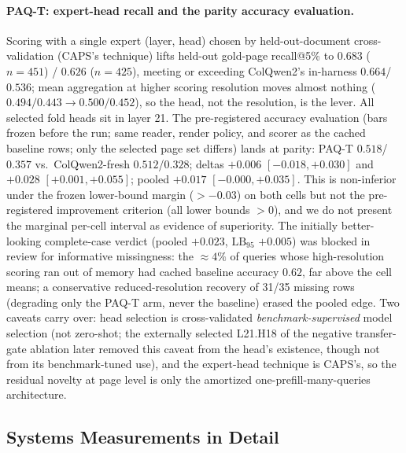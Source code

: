 \documentclass[letterpaper]{article} %
\newcommand{\paqt}{\textsc{PAQ-T}}
\newcommand{\lb}{\mathrm{LB}_{95}}
\begin{document}
\paragraph{\paqt{}: expert-head recall and the parity accuracy evaluation.} Scoring with a single expert (layer, head) chosen by held-out-document cross-validation (CAPS's technique) lifts held-out gold-page recall@5\% to $0.683$ ($n{=}451$) / $0.626$ ($n{=}425$), meeting or exceeding ColQwen2's in-harness $0.664$/$0.536$; mean aggregation at higher scoring resolution moves almost nothing ($0.494/0.443 \to 0.500/0.452$), so the head, not the resolution, is the lever. All selected fold heads sit in layer 21. The pre-registered accuracy evaluation (bars frozen before the run; same reader, render policy, and scorer as the cached baseline rows; only the selected page set differs) lands at parity: \paqt{} $0.518$/$0.357$ vs.\ ColQwen2-fresh $0.512$/$0.328$; deltas $+0.006$ $[-0.018,+0.030]$ and $+0.028$ $[+0.001,+0.055]$; pooled $+0.017$ $[-0.000,+0.035]$. This is non-inferior under the frozen lower-bound margin ($>{-0.03}$) on both cells but not the pre-registered improvement criterion (all lower bounds $>0$), and we do not present the marginal per-cell interval as evidence of superiority. The initially better-looking complete-case verdict (pooled $+0.023$, $\lb$ $+0.005$) was blocked in review for informative missingness: the ${\approx}4\%$ of queries whose high-resolution scoring ran out of memory had cached baseline accuracy $0.62$, far above the cell means; a conservative reduced-resolution recovery of 31/35 missing rows (degrading only the \paqt{} arm, never the baseline) erased the pooled edge. Two caveats carry over: head selection is cross-validated \emph{benchmark-supervised} model selection (not zero-shot; the externally selected L21.H18 of the negative transfer-gate ablation later removed this caveat from the head's existence, though not from its benchmark-tuned use), and the expert-head technique is CAPS's, so the residual novelty at page level is only the amortized one-prefill-many-queries architecture.

\subsection{Systems Measurements in Detail}\label{app:systems}
\end{document}
